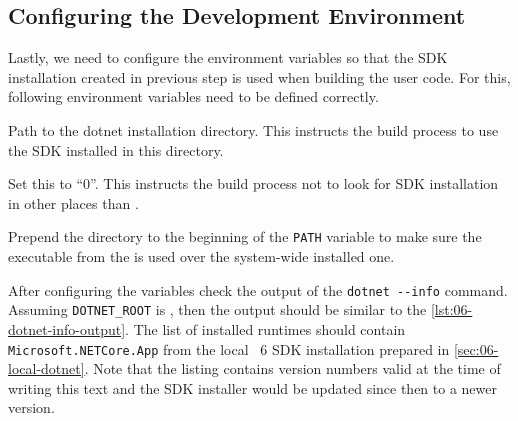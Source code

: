\subsection{Configuring the Development Environment}\label{sec:06-env-vars}

Lastly, we need to configure the environment variables so that the \dotnet{} SDK installation created in previous step is used when building the user code. For this, following environment variables need to be defined correctly.

\begin{description}

         Path to the dotnet installation directory. This instructs the build process to use the SDK installed in this directory.

         Set this to ``0''. This instructs the build process not to look for SDK installation in other places than .

         Prepend the  directory to the beginning of the \texttt{PATH} variable to make sure the  executable from the  is used over the system-wide installed one.
\end{description}

After configuring the variables check the output of the \verb|dotnet --info| command. Assuming
\texttt{DOTNET_ROOT} is , then the output should be similar to the
\autoref{lst:06-dotnet-info-output}. The list of installed \dotnet{} runtimes should contain
\texttt{Microsoft.NETCore.App} from the local \dotnet{}~6 SDK installation prepared in
\autoref{sec:06-local-dotnet}. Note that the listing contains version numbers valid at the time of
writing this text and the SDK installer would be updated since then to a newer version.



